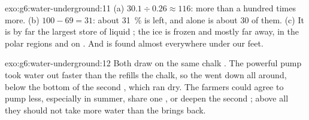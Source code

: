 \begin{solution}{exo:g6:water-underground:11}
(a) $30.1 \div 0.26 \approx 116$: more than a hundred times more.
(b) $100 - 69 = 31$: about 31~\% is left, and  alone is about 30
of them. (c) It is by far the largest store of liquid ; the ice
is frozen and mostly far away, in the polar regions and on . And
 is found almost everywhere under our feet.
\end{solution}

\begin{solution}{exo:g6:water-underground:12}
Both  draw on the same chalk . The powerful pump took water out
faster than the  refills the chalk, so the  went down all
around, below the bottom of the second , which ran dry. The farmers
could agree to pump less, especially in summer, share one , or deepen
the second ; above all they should not take more water than the 
brings back.
\end{solution}


